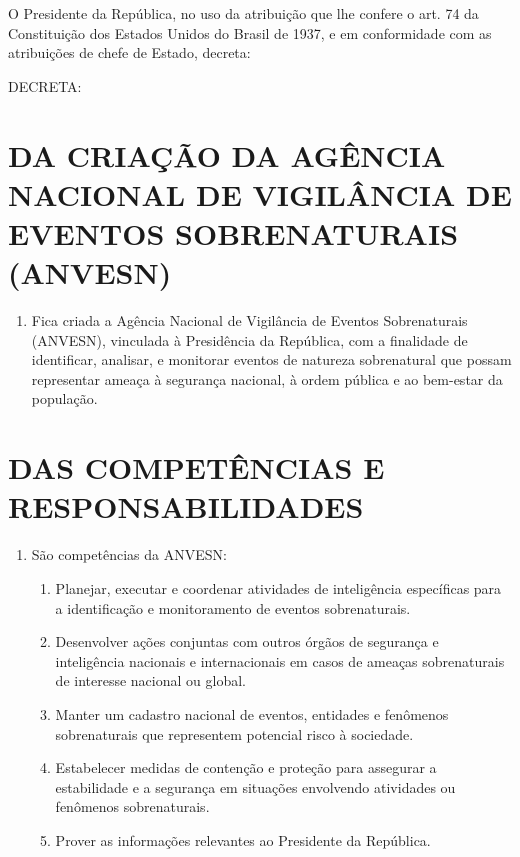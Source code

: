 \documentclass[a4paper,12pt]{report}
\newcommand{\CargoSignatario}{Presidente da República}
\begin{document}
O \CargoSignatario, no uso da atribuição que lhe confere o art. 74 da Constituição dos Estados Unidos do Brasil de 1937, e em conformidade com as atribuições de chefe de Estado, decreta:


DECRETA:

\chapter{DA CRIAÇÃO DA AGÊNCIA NACIONAL DE VIGILÂNCIA DE EVENTOS SOBRENATURAIS (ANVESN)}

\begin{enumerate}[label=Art. \arabic*]

\item Fica criada a Agência Nacional de Vigilância de Eventos Sobrenaturais (ANVESN), vinculada à Presidência da República, com a finalidade de identificar, analisar, e monitorar eventos de natureza sobrenatural que possam representar ameaça à segurança nacional, à ordem pública e ao bem-estar da população.

\end{enumerate}

\chapter{DAS COMPETÊNCIAS E RESPONSABILIDADES}

\begin{enumerate}[resume, label=Art. \arabic*]

\item São competências da ANVESN:

\begin{enumerate}[label=\roman*.]

\item Planejar, executar e coordenar atividades de inteligência específicas para a identificação e monitoramento de eventos sobrenaturais.

\item Desenvolver ações conjuntas com outros órgãos de segurança e inteligência nacionais e internacionais em casos de ameaças sobrenaturais de interesse nacional ou global.

\item Manter um cadastro nacional de eventos, entidades e fenômenos sobrenaturais que representem potencial risco à sociedade.

\item Estabelecer medidas de contenção e proteção para assegurar a estabilidade e a segurança em situações envolvendo atividades ou fenômenos sobrenaturais.

\item Prover as informações relevantes ao Presidente da República.

\end{enumerate}

\end{enumerate}
\end{document}
